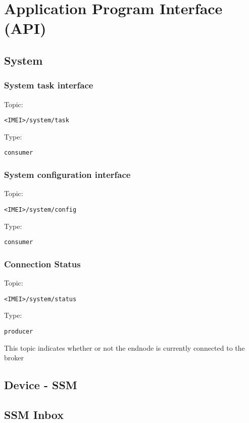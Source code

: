 \section{Application Program Interface (API)}

\subsection{System}

\subsubsection{System task interface}

Topic:
\begin{lstlisting}<IMEI>/system/task\end{lstlisting}
Type:
\begin{lstlisting}consumer\end{lstlisting}
    
\subsubsection{System configuration interface}

Topic:
\begin{lstlisting}<IMEI>/system/config\end{lstlisting}
Type:
\begin{lstlisting}consumer\end{lstlisting}
    
\subsubsection{Connection Status}

Topic:
\begin{lstlisting}<IMEI>/system/status\end{lstlisting}
Type:
\begin{lstlisting}producer\end{lstlisting}
    
This topic indicates whether or not the endnode is currently connected to the broker


\subsection{Device - SSM}

\subsection{SSM Inbox}


